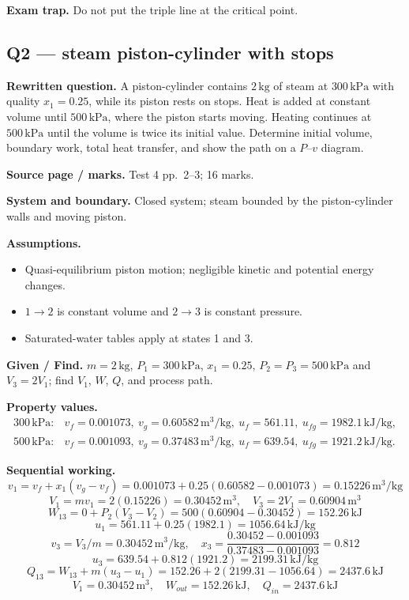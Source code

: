 \textbf{Exam trap.} Do not put the triple line at the critical point.

\subsection*{Q2 --- steam piston-cylinder with stops}
\textbf{Rewritten question.} A piston-cylinder contains $2\,\mathrm{kg}$ of steam at $300\,\mathrm{kPa}$ with quality $x_1=0.25$, while its piston rests on stops. Heat is added at constant volume until $500\,\mathrm{kPa}$, where the piston starts moving. Heating continues at $500\,\mathrm{kPa}$ until the volume is twice its initial value. Determine initial volume, boundary work, total heat transfer, and show the path on a $P$--$v$ diagram.

\textbf{Source page / marks.} Test 4 pp.~2--3; 16 marks.

\textbf{System and boundary.} Closed system; steam bounded by the piston-cylinder walls and moving piston.

\textbf{Assumptions.}
\begin{itemize}
  \item Quasi-equilibrium piston motion; negligible kinetic and potential energy changes.
  \item $1\to2$ is constant volume and $2\to3$ is constant pressure.
  \item Saturated-water tables apply at states 1 and 3.
\end{itemize}

\textbf{Given / Find.} $m=2\,\mathrm{kg}$, $P_1=300\,\mathrm{kPa}$, $x_1=0.25$, $P_2=P_3=500\,\mathrm{kPa}$ and $V_3=2V_1$; find $V_1$, $W$, $Q$, and process path.


\textbf{Property values.}
\[
\begin{array}{ll}
300\,\mathrm{kPa}:&v_f=0.001073,\ v_g=0.60582\,\mathrm{m^3/kg},\ u_f=561.11,\ u_{fg}=1982.1\,\mathrm{kJ/kg},\\
500\,\mathrm{kPa}:&v_f=0.001093,\ v_g=0.37483\,\mathrm{m^3/kg},\ u_f=639.54,\ u_{fg}=1921.2\,\mathrm{kJ/kg}.
\end{array}
\]

\textbf{Sequential working.}
\[
v_1=v_f+x_1(v_g-v_f)=0.001073+0.25(0.60582-0.001073)=0.15226\,\mathrm{m^3/kg}
\]
\[
V_1=mv_1=2(0.15226)=0.30452\,\mathrm{m^3},\quad V_3=2V_1=0.60904\,\mathrm{m^3}
\]
\[
W_{13}=0+P_2(V_3-V_2)=500(0.60904-0.30452)=152.26\,\mathrm{kJ}
\]
\[
u_1=561.11+0.25(1982.1)=1056.64\,\mathrm{kJ/kg}
\]
\[
v_3=V_3/m=0.30452\,\mathrm{m^3/kg},\quad x_3=\frac{0.30452-0.001093}{0.37483-0.001093}=0.812
\]
\[
u_3=639.54+0.812(1921.2)=2199.31\,\mathrm{kJ/kg}
\]
\[
Q_{13}=W_{13}+m(u_3-u_1)=152.26+2(2199.31-1056.64)=2437.6\,\mathrm{kJ}
\]
\[
\boxed{V_1=0.30452\,\mathrm{m^3},\quad W_{out}=152.26\,\mathrm{kJ},\quad Q_{in}=2437.6\,\mathrm{kJ}}
\]

